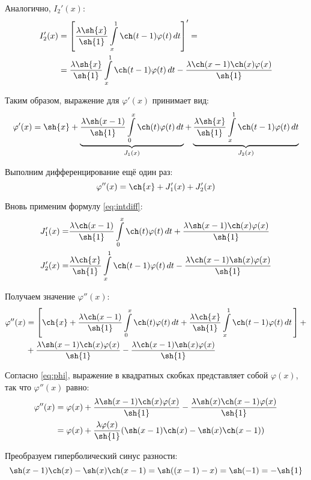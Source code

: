 \documentclass{article}
\numberwithin{equation}{section}
\renewcommand{\phi}{\varphi}
\newcommand{\intl}{\int\limits}
\begin{document}
Аналогично, $I_2'(x)$:
\begin{align*}
  I_2'(x) &= \left[\frac{\lambda \sh{x}}{\sh{1}}\intl_x^1{\ch(t-1)\phi(t)\,dt} \right] ' = \\
  &= \frac{\lambda \sh{x}}{\sh{1}}\intl_x^1{\ch(t-1)\phi(t)\,dt} -
  \frac{\lambda \ch(x-1) \ch(x) \phi(x)}{\sh{1}}
\end{align*}

Таким образом, выражение для $\phi'(x)$ принимает вид:
\begin{equation}
  \label{eq:phidiff}
  \phi'(x) = \sh{x} +
  \underbrace{\frac{\lambda \sh(x-1)}{\sh{1}}\intl_0^x{\ch(t) \phi(t)\,dt}}_{J_1(x)} +
  \underbrace{\frac{\lambda \sh{x}}{\sh{1}}\intl_x^1{\ch(t-1)\phi(t)\,dt}}_{J_2(x)}
\end{equation}

Выполним дифференцирование ещё один раз:
\begin{equation*}
  \phi''(x) = \ch{x} + J_1'(x) + J_2'(x)
\end{equation*}

Вновь применим формулу \eqref{eq:intdiff}:
\begin{align*}
  J_1'(x) =& \frac{\lambda \ch(x-1)}{\sh{1}}\intl_0^x{\ch(t)\phi(t)\,dt} +
  \frac{\lambda \sh(x-1) \ch(x) \phi(x)}{\sh{1}} \\
  J_2'(x) =& \frac{\lambda \ch{x}}{\sh{1}}\intl_x^1{\ch(t-1)\phi(t)\,dt} -
  \frac{\lambda \ch(x-1) \sh(x) \phi(x)}{\sh{1}}
\end{align*}

Получаем значение $\phi''(x)$:
\begin{align*}
  \phi''(x) &= \left [ \ch{x} +
  \frac{\lambda \ch(x-1)}{\sh{1}}\intl_0^x{\ch(t)\phi(t)\,dt} +
  \frac{\lambda \ch{x}}{\sh{1}}\intl_x^1{\ch(t-1)\phi(t)\,dt}\, \right ] +\\
  &+ \frac{\lambda \sh(x-1) \ch(x) \phi(x)}{\sh{1}} -
  \frac{\lambda \ch(x-1) \sh(x) \phi(x)}{\sh{1}}
\end{align*}

Согласно \eqref{eq:phi}, выражение в квадратных скобках представляет
собой $\phi(x)$, так что $\phi''(x)$ равно:
\begin{align*}
  \phi''(x) &= \phi(x) + 
  \frac{\lambda \sh(x-1) \ch(x) \phi(x)}{\sh{1}} -
  \frac{\lambda \sh(x) \ch(x-1) \phi(x)}{\sh{1}} \\
  &= \phi(x) + \frac{\lambda \phi(x)}{\sh{1}}
  ( \sh(x-1) \ch(x) - \sh(x) \ch(x-1) )
\end{align*}

Преобразуем гиперболический синус разности:
\begin{equation*}
  \sh(x-1) \ch(x) - \sh(x) \ch(x-1) = \sh((x-1) - x) = \sh(-1) = -\sh{1}
\end{equation*}
\end{document}

